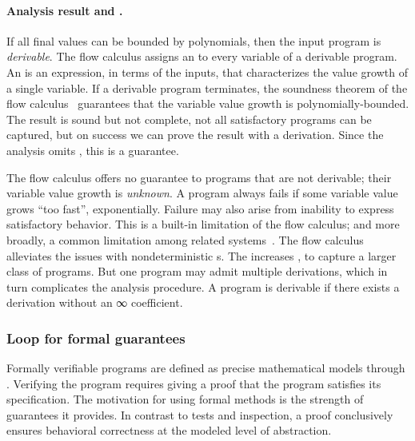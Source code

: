 \paragraph*{Analysis result and .}
If all final values can be bounded by polynomials, then the input program is
\emph{derivable}. The flow calculus assigns an \emph{} to every
variable of a derivable program. An  is an expression, in terms
of the inputs, that characterizes the value growth of a single variable. If a
derivable program terminates, the soundness theorem of the flow
calculus~\cite[p. 11]{jones2009} guarantees
that the variable value growth is polynomially-bounded. The result is sound but
not complete, \ie not all satisfactory programs can be captured, but on success
we can prove the result with a derivation. Since the analysis omits
, this is a  guarantee.

The flow calculus offers no guarantee to programs that are
not derivable; their variable value growth is
\emph{unknown}. A program always fails if some variable value grows \enquote{too
fast}, \eg exponentially. Failure may also arise from inability to express
satisfactory behavior. This is a built-in limitation of the flow calculus; and
more broadly, a common limitation among related systems~\cite[p.
2]{baillot2015}. The flow calculus alleviates the issues with
nondeterministic s. The
 increases , to capture a larger class
of programs. But one program may admit multiple derivations, which in turn
complicates the analysis procedure. A program is derivable
if there exists a derivation without an ∞ coefficient.

\subsubsection{Loop  for formal guarantees}
\label{subsec:specs}

Formally verifiable programs are defined as precise
mathematical models through . Verifying the program requires
giving a proof that the program satisfies its specification. The motivation for
using formal methods is the strength of guarantees it provides. In contrast to
tests and inspection, a proof conclusively ensures behavioral correctness at the
modeled level of abstraction.

